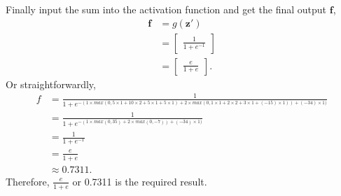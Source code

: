 \documentclass[10pt]{article}
\begin{document}
\begin{enumerate}[1)]
Finally input the sum into the activation function and get the final output $\pmb{f}$,
\begin{align*}
\pmb{f}&=g(\pmb{z}')\\
&=
  \begin{bmatrix}
    \frac{1}{1+e^{-1}}
  \end{bmatrix}\\
&=
  \begin{bmatrix}
    \frac{e}{1+e}
  \end{bmatrix}.
\end{align*}
Or straightforwardly,
\begin{align*}
f&=\frac{1}{1+e^{-(1\times max(0,5\times1+10\times2+5\times1+5\times1)+2\times max(0,1\times1+2\times2+3\times1+(-15)\times1))+(-34)\times1)}}\\
&=\frac{1}{1+e^{-(1\times max(0,35)+2\times max(0,-7))+(-34)\times1)}}\\
&=\frac{1}{1+e^{-1}}\\
&=\frac{e}{1+e}\\
&\approx0.7311.
\end{align*}
Therefore, $\frac{e}{1+e}$ or 0.7311 is the required result.

\end{enumerate}
\vspace{3mm}
\end{document}
